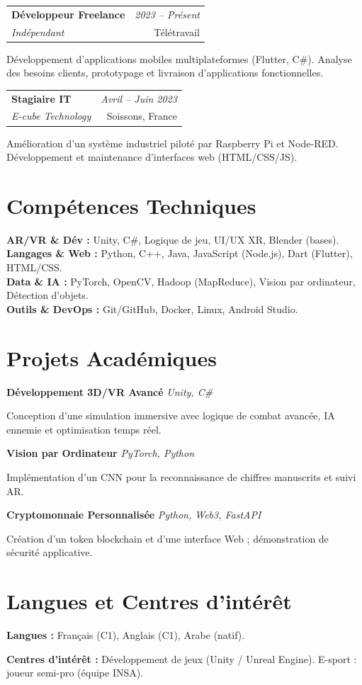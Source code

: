 \documentclass[10pt, varwidth=18.6cm, border=1.2cm]{standalone}
\makeatletter
\newcommand{\entry}[4]{
  \vspace{2pt}
  \noindent
  \begin{tabular*}{\textwidth}{@{\extracolsep{\fill}}lr}
    \textbf{#1} & \textit{#2} \\
    \textit{#3} & \small #4 \\
  \end{tabular*}
  \vspace{4pt}
}
\newcommand{\project}[2]{
  \textbf{#1} \hfill \textit{\footnotesize #2} \par
  \vspace{2pt}
}
\makeatother
\begin{document}
\entry{Développeur Freelance}{2023 -- Présent}{Indépendant}{Télétravail}
Développement d’applications mobiles multiplateformes (Flutter, C\#).  
Analyse des besoins clients, prototypage et livraison d'applications fonctionnelles.

\entry{Stagiaire IT}{Avril -- Juin 2023}{E-cube Technology}{Soissons, France}
Amélioration d'un système industriel piloté par Raspberry Pi et Node-RED.  
Développement et maintenance d’interfaces web (HTML/CSS/JS).

\section{Compétences Techniques}

\textbf{AR/VR \& Dév :} Unity, C\#, Logique de jeu, UI/UX XR, Blender (bases).   \\
\textbf{Langages \& Web :} Python, C++, Java, JavaScript (Node.js), Dart (Flutter), HTML/CSS.   \\
\textbf{Data \& IA :} PyTorch, OpenCV, Hadoop (MapReduce), Vision par ordinateur, Détection d’objets.  \\
\textbf{Outils \& DevOps :} Git/GitHub, Docker, Linux, Android Studio.

\section{Projets Académiques}

\project{Développement 3D/VR Avancé}{Unity, C\#}
Conception d'une simulation immersive avec logique de combat avancée, IA ennemie et optimisation temps réel.

\project{Vision par Ordinateur}{PyTorch, Python}
Implémentation d’un CNN pour la reconnaissance de chiffres manuscrits et suivi AR.

\project{Cryptomonnaie Personnalisée}{Python, Web3, FastAPI}
Création d’un token blockchain et d’une interface Web ; démonstration de sécurité applicative.

\section{Langues et Centres d'intérêt}

\textbf{Langues :} Français (C1), Anglais (C1), Arabe (natif).  

\textbf{Centres d’intérêt :}  
Développement de jeux (Unity / Unreal Engine).  
E-sport : joueur semi-pro (équipe INSA).
\end{document}
